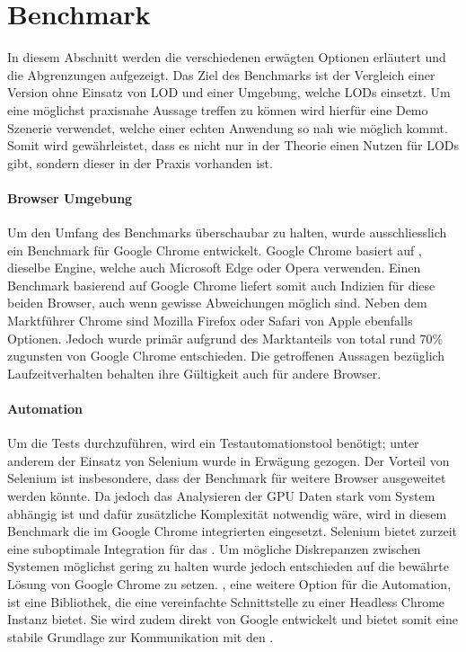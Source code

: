\section{Benchmark}

In diesem Abschnitt werden die verschiedenen erwägten Optionen erläutert und die Abgrenzungen aufgezeigt.
Das Ziel des Benchmarks ist der Vergleich einer Version ohne Einsatz von LOD und einer Umgebung, welche LODs einsetzt. Um eine möglichst praxisnahe Aussage treffen zu können wird hierfür eine Demo Szenerie verwendet, welche einer echten Anwendung so nah wie möglich kommt. Somit wird gewährleistet, dass es nicht nur in der Theorie einen Nutzen für LODs gibt, sondern dieser in der Praxis vorhanden ist.

\paragraph{Browser Umgebung}
Um den Umfang des Benchmarks überschaubar zu halten, wurde ausschliesslich ein Benchmark für Google Chrome entwickelt.
Google Chrome basiert auf , dieselbe Engine, welche auch Microsoft Edge oder Opera verwenden.
Einen Benchmark basierend auf Google Chrome liefert somit auch Indizien für diese beiden Browser, auch wenn gewisse Abweichungen möglich sind.
Neben dem Marktführer Chrome sind Mozilla Firefox oder Safari von Apple ebenfalls Optionen. Jedoch wurde primär aufgrund des Marktanteils von total rund 70\% \cite{browserUsage} zugunsten von Google Chrome entschieden.
Die getroffenen Aussagen bezüglich Laufzeitverhalten behalten ihre Gültigkeit auch für andere Browser.

\paragraph{Automation}
Um die Tests durchzuführen, wird ein Testautomationstool benötigt; unter anderem der Einsatz von Selenium wurde in Erwägung gezogen.
Der Vorteil von Selenium ist insbesondere, dass der Benchmark für weitere Browser ausgeweitet werden könnte.
Da jedoch das Analysieren der GPU Daten stark vom System abhängig ist und dafür zusätzliche Komplexität notwendig wäre, wird in diesem Benchmark die im Google Chrome integrierten  eingesetzt.
Selenium bietet zurzeit eine suboptimale Integration für das .
Um mögliche Diskrepanzen zwischen Systemen möglichst gering zu halten wurde jedoch entschieden auf die bewährte Lösung von Google Chrome zu setzen.
, eine weitere Option für die Automation, ist eine Bibliothek, die eine vereinfachte Schnittstelle zu einer Headless Chrome Instanz bietet.
Sie wird zudem direkt von Google entwickelt und bietet somit eine stabile Grundlage zur Kommunikation mit den .

